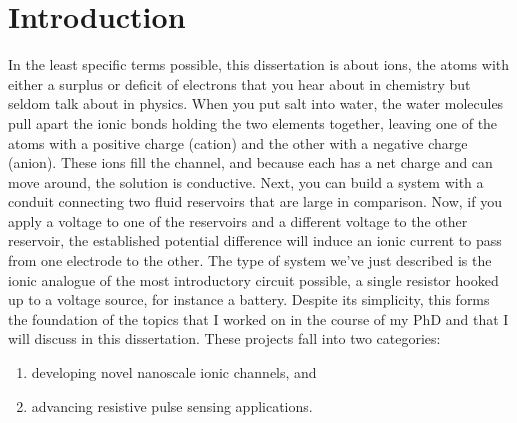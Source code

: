 \graphicspath{{../images/ch1/}}	%


\chapter{Introduction}
\label{chap:intro}

	In the least specific terms possible, this dissertation is about ions, the atoms with either a surplus or deficit of electrons that you hear about in chemistry but seldom talk about in physics. When you put salt into water, the water molecules pull apart the ionic bonds holding the two elements together, leaving one of the atoms with a positive charge (cation) and the other with a negative charge (anion). These ions fill the channel, and because each has a net charge and can move around, the solution is conductive. Next, you can build a system with a conduit connecting two fluid reservoirs that are large in comparison. Now, if you apply a voltage to one of the reservoirs and a different voltage to the other reservoir, the established potential difference will induce an ionic current to pass from one electrode to the other. The type of system we've just described is the ionic analogue of the most introductory circuit possible, a single resistor hooked up to a voltage source, for instance a battery. Despite its simplicity, this forms the foundation of the topics that I worked on in the course of my PhD and that I will discuss in this dissertation. These projects fall into two categories: 
	
	
	\begin{enumerate}
		\item developing novel nanoscale ionic channels, and
		\item advancing resistive pulse sensing applications.
	\end{enumerate}
	
